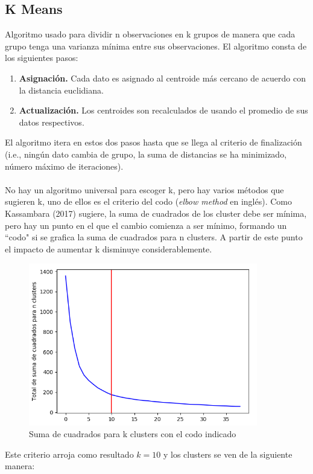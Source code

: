 \documentclass[12pt,spanish]{article}
\begin{document}
	\subsection{K Means}
	Algoritmo usado para dividir n observaciones en k grupos de manera que cada grupo tenga una varianza mínima entre sus observaciones. El algoritmo consta de los siguientes pasos:
	\begin{enumerate}
		\item \textbf{Asignación.} Cada dato es asignado al centroide más cercano de acuerdo con la distancia euclidiana.
		\item \textbf{Actualización.} Los centroides son recalculados de usando el promedio de sus datos respectivos.
	\end{enumerate}
	El algoritmo itera en estos dos pasos hasta que se llega al criterio de finalización (i.e., ningún dato cambia de grupo, la suma de distancias se ha minimizado, número máximo de iteraciones).\\\\
	No hay un algoritmo universal para escoger k, pero hay varios métodos que sugieren k, uno de ellos es el criterio del codo (\textit{elbow method} en inglés). Como Kassambara (2017) sugiere, la suma de cuadrados de los cluster debe ser mínima, pero hay un punto en el que el cambio comienza a ser mínimo, formando un ``codo" si se grafica la suma de cuadrados para n clusters. A partir de este punto el impacto de aumentar k disminuye considerablemente.
	\begin{figure}[H]
		\centering
		\includegraphics[width=10cm]{Imagenes/kmeans_elbow.png}
		\begin{centering}
			\caption{Suma de cuadrados para k clusters con el codo indicado}
		\end{centering}
	\end{figure}
	Este criterio arroja como resultado $k=10$ y los clusters se ven de la siguiente manera:
\end{document}
